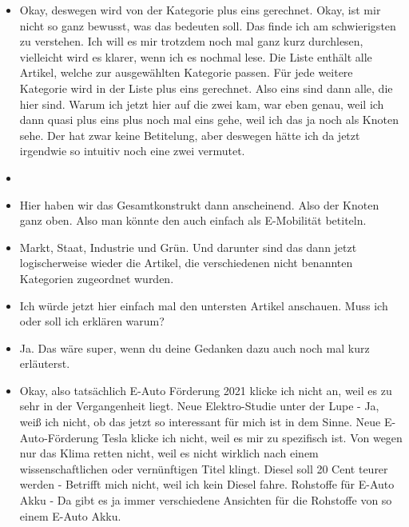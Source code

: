 {\begin{itemize}[]
            \item {} Okay, deswegen wird von der Kategorie plus eins gerechnet.
                  Okay, ist mir nicht so ganz bewusst, was das bedeuten soll.
                  Das finde ich am schwierigsten zu verstehen.
                  Ich will es mir trotzdem noch mal ganz kurz durchlesen, vielleicht wird es klarer, wenn ich es nochmal lese.
                  Die Liste enthält alle Artikel, welche zur ausgewählten Kategorie passen.
                  Für jede weitere Kategorie wird in der Liste plus eins gerechnet.
                  Also eins sind dann alle, die hier sind.
                  Warum ich jetzt hier auf die zwei kam, war eben genau, weil ich dann quasi plus eins plus noch mal eins gehe, weil ich das ja noch als Knoten sehe.
                  Der hat zwar keine Betitelung, aber deswegen hätte ich da jetzt irgendwie so intuitiv noch eine zwei vermutet.
            \item {}
            \item {} Hier haben wir das Gesamtkonstrukt dann anscheinend.
                  Also der Knoten ganz oben.
                  Also man könnte den auch einfach als E-Mobilität betiteln.
            \item {} Markt, Staat, Industrie und Grün.
                  Und darunter sind das dann jetzt logischerweise wieder die Artikel, die verschiedenen nicht benannten Kategorien zugeordnet wurden.
            \item {} Ich würde jetzt hier einfach mal den untersten Artikel anschauen. Muss ich oder soll ich erklären warum?
            \item {} Ja. Das wäre super, wenn du deine Gedanken dazu auch noch mal kurz erläuterst.
            \item {} Okay, also tatsächlich \flqq E-Auto Förderung 2021\frqq{} klicke ich nicht an, weil es zu sehr in der Vergangenheit liegt.
                  \flqq Neue Elektro-Studie unter der Lupe\frqq{} - Ja, weiß ich nicht, ob das jetzt so interessant für mich ist in dem Sinne.
                  \flqq Neue E-Auto-Förderung Tesla\frqq{} klicke ich nicht, weil es mir zu spezifisch ist.
                  \flqq Von wegen nur das Klima retten\frqq{} nicht, weil es nicht wirklich nach einem wissenschaftlichen oder vernünftigen Titel klingt.
                  \flqq Diesel soll 20 Cent teurer werden\frqq{} - Betrifft mich nicht, weil ich kein Diesel fahre.
                  \flqq Rohstoffe für E-Auto Akku\frqq{} - Da gibt es ja immer verschiedene Ansichten für die Rohstoffe von so einem E-Auto Akku.

\end{itemize}}

